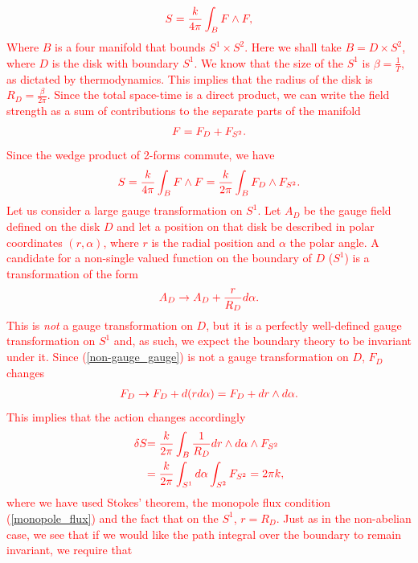 \begin{align}
    \textcolor{red}{S=\frac{k}{4 \pi} \int_{B} F\wedge F,}
\end{align}
 \textcolor{red}{ Where $B$ is a four manifold that bounds $S^1 \times S^2$. Here we shall take $B= D\times S^2$, where $D$ is the disk with boundary $S^1$. We know that the size of the $S^1$ is $\beta= \frac{1}{T}$, as dictated by thermodynamics. This implies that the radius of the disk is $R_D=\frac{\beta}{2\pi}$. Since the total space-time is a direct product, we can write the field strength as a sum of contributions to the separate parts of the manifold} 
\begin{align}
    \textcolor{red}{F= F_D +F_{S^2}.}
\end{align}
 \textcolor{red}{Since the wedge product of 2-forms commute, we have }
\begin{align}
    \textcolor{red}{   S = \frac{k}{4\pi}\int_B F\wedge F = \frac{k}{2\pi} \int_B F_{D} \wedge F_{S^2}.}
\end{align}
\textcolor{red}{Let \textcolor{red}{us} consider a large gauge transformation on $S^1$. Let $A_D$ be the gauge field defined on the disk $D$ and let a position on that disk be described in polar coordinates $(r, \alpha)$, where $r$ is the radial position and $\alpha$ the polar angle. A candidate for a non-single valued function on the boundary of $D$ ($S^1$) is a transformation of the form }
\begin{align}
    \textcolor{red}{A_D \rightarrow A_D + \frac{r}{R_D} d\alpha. \label{non-gauge_gauge}}
\end{align}
\textcolor{red}{This is \textit{not} a gauge transformation on $D$, but it is a perfectly well-defined gauge transformation on $S^1$ and, as such, we expect the boundary theory to be invariant under it. Since (\ref{non-gauge_gauge}) is not a gauge transformation on $D$, $F_D$ changes}
\begin{align}
    \textcolor{red}{F_D \rightarrow F_D + d (r d\alpha) =F_D + dr \wedge d\alpha.}
\end{align}
 \textcolor{red}{This implies that the action changes accordingly }
\begin{align}
    \textcolor{red}{\delta S }& \textcolor{red}{= \frac{k}{2\pi} \int_B \frac{1}{R_D} dr \wedge d\alpha \wedge F_{S^2}}\\
    & \textcolor{red}{= \frac{k}{2\pi} \int_{S^1}  d\alpha \int_{S^2} F_{S^2}=2\pi k,}
\end{align}
 \textcolor{red}{where we have used Stokes' theorem, the monopole flux condition (\ref{monopole_flux}) and the fact that on the $S^1$, $r=R_D$. Just as in the non-abelian case, we see that if we would like the path integral over the boundary to remain invariant, we require that }
